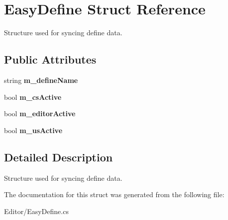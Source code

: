 \hypertarget{struct_easy_define}{}\section{Easy\+Define Struct Reference}
\label{struct_easy_define}


Structure used for syncing define data.  


\subsection*{Public Attributes}
\begin{DoxyCompactItemize}
\item 
\hypertarget{struct_easy_define_a9ec78d3aad3051a8125ef646b9e6506c}{}string {\bfseries m\+\_\+define\+Name}\label{struct_easy_define_a9ec78d3aad3051a8125ef646b9e6506c}

\item 
\hypertarget{struct_easy_define_a4fdb61309a73e3a92c7233bf71a0d43c}{}bool {\bfseries m\+\_\+cs\+Active}\label{struct_easy_define_a4fdb61309a73e3a92c7233bf71a0d43c}

\item 
\hypertarget{struct_easy_define_a348436a6ffcf427d84fdb0923a91472e}{}bool {\bfseries m\+\_\+editor\+Active}\label{struct_easy_define_a348436a6ffcf427d84fdb0923a91472e}

\item 
\hypertarget{struct_easy_define_a31989bfb9a97f3d612a639c0d0988765}{}bool {\bfseries m\+\_\+us\+Active}\label{struct_easy_define_a31989bfb9a97f3d612a639c0d0988765}

\end{DoxyCompactItemize}


\subsection{Detailed Description}
Structure used for syncing define data. 



The documentation for this struct was generated from the following file\+:\begin{DoxyCompactItemize}
\item 
Editor/Easy\+Define.\+cs\end{DoxyCompactItemize}
